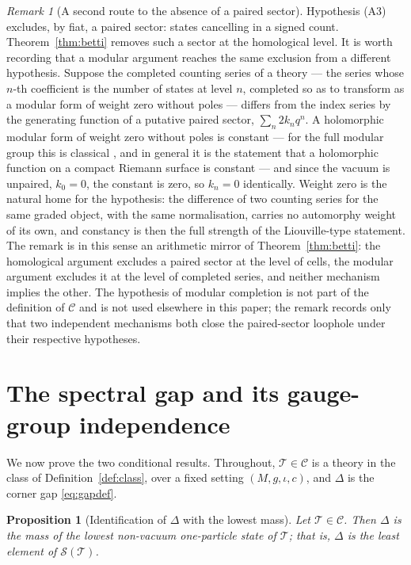 \documentclass[11pt,a4paper]{article}
\newcommand{\class}{\mathcal{C}}
\newcommand{\thy}{\mathcal{T}}
\theoremstyle{plain}
\newtheorem{proposition}[theorem]{Proposition}
\theoremstyle{definition}
\theoremstyle{remark}
\newtheorem{remark}[theorem]{Remark}
\begin{document}
\begin{remark}[A second route to the absence of a paired sector]
\label{rem:secondroute}
Hypothesis (A3) excludes, by fiat, a paired sector: states cancelling in a signed count. Theorem~\ref{thm:betti} removes such a sector at the homological level. It is worth recording that a modular argument reaches the same exclusion from a different hypothesis. Suppose the completed counting series of a theory --- the series whose $n$-th coefficient is the number of states at level $n$, completed so as to transform as a modular form of weight zero without poles --- differs from the index series by the generating function of a putative paired sector, $\sum_n 2k_n q^n$. A holomorphic modular form of weight zero without poles is constant --- for the full modular group this is classical \cite[Ch.~VII]{Serre}, and in general it is the statement that a holomorphic function on a compact Riemann surface is constant --- and since the vacuum is unpaired, $k_0 = 0$, the constant is zero, so $k_n = 0$ identically. Weight zero is the natural home for the hypothesis: the difference of two counting series for the same graded object, with the same normalisation, carries no automorphy weight of its own, and constancy is then the full strength of the Liouville-type statement. The remark is in this sense an arithmetic mirror of Theorem~\ref{thm:betti}: the homological argument excludes a paired sector at the level of cells, the modular argument excludes it at the level of completed series, and neither mechanism implies the other. The hypothesis of modular completion is not part of the definition of $\class$ and is not used elsewhere in this paper; the remark records only that two independent mechanisms both close the paired-sector loophole under their respective hypotheses.
\end{remark}

\section{The spectral gap and its gauge-group independence}\label{sec:gap}

We now prove the two conditional results. Throughout, $\thy \in \class$ is a theory in the class of Definition~\ref{def:class}, over a fixed setting $(M, g, \iota, c)$, and $\Delta$ is the corner gap \eqref{eq:gapdef}.

\begin{proposition}[Identification of $\Delta$ with the lowest
mass]\label{prop:identification} Let $\thy \in \class$. Then $\Delta$ is the mass of the lowest non-vacuum one-particle state of $\thy$; that is, $\Delta$ is the least element of $\mathcal{S}(\thy)$.
\end{proposition}
\end{document}
